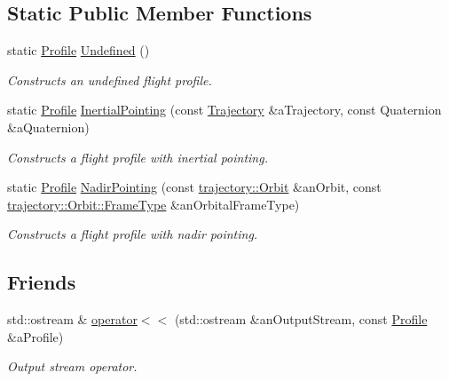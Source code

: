 \subsection*{Static Public Member Functions}
\begin{DoxyCompactItemize}
\item 
static \hyperlink{classostk_1_1astro_1_1flight_1_1_profile}{Profile} \hyperlink{classostk_1_1astro_1_1flight_1_1_profile_aa966c10872c2d193d43c358b25f64289}{Undefined} ()
\begin{DoxyCompactList}\small\item\em Constructs an undefined flight profile. \end{DoxyCompactList}\item 
static \hyperlink{classostk_1_1astro_1_1flight_1_1_profile}{Profile} \hyperlink{classostk_1_1astro_1_1flight_1_1_profile_a17e61fe4527fb08c012c56a01fa23292}{Inertial\+Pointing} (const \hyperlink{classostk_1_1astro_1_1_trajectory}{Trajectory} \&a\+Trajectory, const Quaternion \&a\+Quaternion)
\begin{DoxyCompactList}\small\item\em Constructs a flight profile with inertial pointing. \end{DoxyCompactList}\item 
static \hyperlink{classostk_1_1astro_1_1flight_1_1_profile}{Profile} \hyperlink{classostk_1_1astro_1_1flight_1_1_profile_ab618c70fde205ab0df2c963628223ad8}{Nadir\+Pointing} (const \hyperlink{classostk_1_1astro_1_1trajectory_1_1_orbit}{trajectory\+::\+Orbit} \&an\+Orbit, const \hyperlink{classostk_1_1astro_1_1trajectory_1_1_orbit_a1cc449ad56374471a8ab4300dde979e7}{trajectory\+::\+Orbit\+::\+Frame\+Type} \&an\+Orbital\+Frame\+Type)
\begin{DoxyCompactList}\small\item\em Constructs a flight profile with nadir pointing. \end{DoxyCompactList}\end{DoxyCompactItemize}
\subsection*{Friends}
\begin{DoxyCompactItemize}
\item 
std\+::ostream \& \hyperlink{classostk_1_1astro_1_1flight_1_1_profile_a8747e69fc10f1b068a0dd02d79da3b95}{operator$<$$<$} (std\+::ostream \&an\+Output\+Stream, const \hyperlink{classostk_1_1astro_1_1flight_1_1_profile}{Profile} \&a\+Profile)
\begin{DoxyCompactList}\small\item\em Output stream operator. \end{DoxyCompactList}\end{DoxyCompactItemize}


